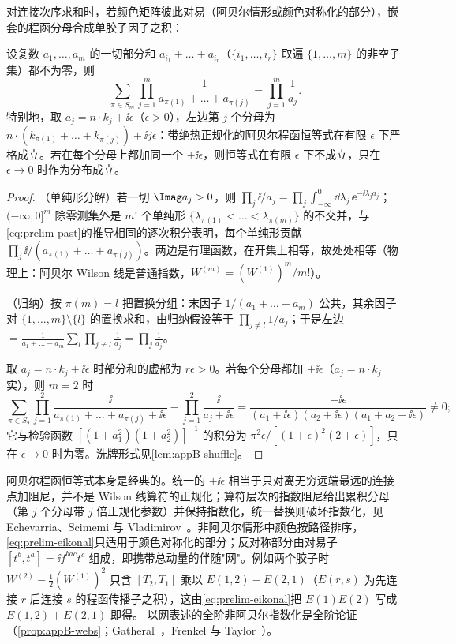 对连接次序求和时，若颜色矩阵彼此对易（阿贝尔情形或颜色对称化的部分），嵌套的程函分母合成单胶子因子之积：

\begin{lemma}[程函恒等式]\label{lem:prelim-eikonal-identity}
设复数 $a_1,\dots,a_m$ 的一切部分和 $a_{i_1}+\dots+a_{i_r}$（$\{i_1,\dots,i_r\}$ 取遍 $\{1,\dots,m\}$ 的非空子集）都不为零，则
\begin{equation}\label{eq:prelim-eikonal}
\sum_{\pi\in S_m}\prod_{j=1}^m\frac1{a_{\pi(1)}+\dots+a_{\pi(j)}}=\prod_{j=1}^m\frac1{a_j} .
\end{equation}
特别地，取 $a_j=n\cdot k_j+\ii\epsilon$（$\epsilon>0$），左边第 $j$ 个分母为 $n\cdot(k_{\pi(1)}+\dots+k_{\pi(j)})+\ii j\epsilon$：带绝热正规化的阿贝尔程函恒等式在有限 $\epsilon$ 下严格成立。若在每个分母上都加同一个 $+\ii\epsilon$，则恒等式在有限 $\epsilon$ 下不成立，只在 $\epsilon\to0$ 时作为分布成立。%
\end{lemma}

\begin{proof}
（单纯形分解）若一切 $\Imag a_j>0$，则 $\prod_j\ii/a_j=\prod_j\int_{-\infty}^0\dd\lambda_j\,\ee^{-\ii\lambda_ja_j}$；$(-\infty,0]^m$ 除零测集外是 $m!$ 个单纯形 $\{\lambda_{\pi(1)}<\dots<\lambda_{\pi(m)}\}$ 的不交并，与\cref{eq:prelim-past}的推导相同的逐次积分表明，每个单纯形贡献 $\prod_j\ii/(a_{\pi(1)}+\dots+a_{\pi(j)})$。两边是有理函数，在开集上相等，故处处相等（物理上：阿贝尔 Wilson 线是普通指数，$W^{(m)}=(W^{(1)})^m/m!$）。

（归纳）按 $\pi(m)=l$ 把置换分组：末因子 $1/(a_1+\dots+a_m)$ 公共，其余因子对 $\{1,\dots,m\}\setminus\{l\}$ 的置换求和，由归纳假设等于 $\prod_{j\ne l}1/a_j$；于是左边 $=\frac1{a_1+\dots+a_m}\sum_l\prod_{j\ne l}\frac1{a_j}=\prod_j\frac1{a_j}$。

取 $a_j=n\cdot k_j+\ii\epsilon$ 时部分和的虚部为 $r\epsilon>0$。若每个分母都加 $+\ii\epsilon$（$a_j=n\cdot k_j$ 实），则 $m=2$ 时
\[
\sum_{\pi\in S_2}\prod_{j=1}^2\frac{\ii}{a_{\pi(1)}+\dots+a_{\pi(j)}+\ii\epsilon}-\prod_{j=1}^2\frac{\ii}{a_j+\ii\epsilon}=\frac{-\ii\epsilon}{(a_1+\ii\epsilon)(a_2+\ii\epsilon)(a_1+a_2+\ii\epsilon)}\ne0 ;
\]
它与检验函数 $[(1+a_1^2)(1+a_2^2)]^{-1}$ 的积分为 $\pi^2\epsilon/[(1+\epsilon)^2(2+\epsilon)]$，只在 $\epsilon\to0$ 时为零。洗牌形式见\cref{lem:appB-shuffle}。
\end{proof}

阿贝尔程函恒等式本身是经典的。统一的 $+\ii\epsilon$ 相当于只对离无穷远端最远的连接点加阻尼，并不是 Wilson 线算符的正规化；算符层次的指数阻尼给出累积分母（第 $j$ 个分母带 $j$ 倍正规化参数）并保持指数化，统一替换则破坏指数化，见 Echevarria、Scimemi 与 Vladimirov~\cite[式~(5)--(6) 及其后的讨论]{Echevarria:2015byo}。非阿贝尔情形中颜色按路径排序，\cref{eq:prelim-eikonal}只适用于颜色对称化的部分；反对称部分由对易子 $[t^b,t^a]=\ii f^{bac}t^c$ 组成，即携带总动量的伴随"网"。例如两个胶子时 $W^{(2)}-\frac12(W^{(1)})^2$ 只含 $[T_2,T_1]$ 乘以 $E(1,2)-E(2,1)$（$E(r,s)$ 为先连接 $r$ 后连接 $s$ 的程函传播子之积），这由\cref{eq:prelim-eikonal}把 $E(1)E(2)$ 写成 $E(1,2)+E(2,1)$ 即得。%
以网表述的全阶非阿贝尔指数化是全阶论证（\cref{prop:appB-webs}；Gatheral~\cite{Gatheral1983}，Frenkel 与 Taylor~\cite{FrenkelTaylor1984}）。


